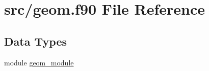 \hypertarget{geom_8f90}{\section{src/geom.f90 File Reference}
\label{geom_8f90}
}
\subsection*{Data Types}
\begin{DoxyCompactItemize}
\item 
module \hyperlink{classgeom__module}{geom\-\_\-module}
\end{DoxyCompactItemize}
